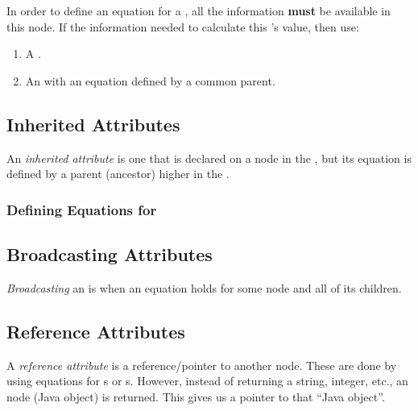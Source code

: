 In order to define an equation for a , all the information \textbf{must} be available in this node.
If the information needed to calculate this 's value, then use:
\begin{enumerate}[noitemsep]
\item A .
\item An  with an equation defined by a common parent.
\end{enumerate}

\subsection{Inherited Attributes}\label{subsec:Inherited_Attributes}
\begin{definition}\label{def:Inherited_Attribute}
  An \emph{inherited attribute} is one that is declared on a node in the , but its equation is defined by a parent (ancestor) higher in the .
\end{definition}

\subsubsection{Defining Equations for }\label{subsubsec:Define_Inherited_Equations}

\subsection{Broadcasting Attributes}\label{subsec:Broadcasting_Attributes}
\begin{definition}[Broadcasting]\label{def:Broadcasting}
  \emph{Broadcasting} an  is when an equation holds for some node and all of its children.
\end{definition}

\subsection{Reference Attributes}\label{subsec:Reference_Attributes}
\begin{definition}\label{def:Reference_Attribute}
  A \emph{reference attribute} is a reference/pointer to another  node.
  These are done by using equations for s or s.
  However, instead of returning a string, integer, etc., an  node (Java object) is returned.
  This gives us a pointer to that ``Java object''.
\end{definition}

